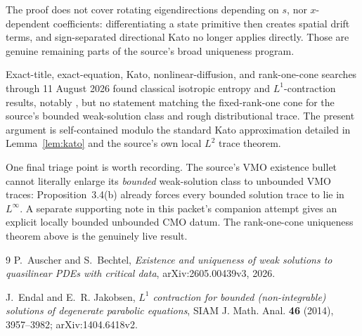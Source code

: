 \documentclass[11pt]{article}
\begin{document}
The proof does not cover rotating eigendirections depending on $s$, nor
$x$-dependent coefficients: differentiating a state primitive then creates
spatial drift terms, and sign-separated directional Kato no longer applies
directly.  Those are genuine remaining parts of the source's broad
uniqueness program.

Exact-title, exact-equation, Kato, nonlinear-diffusion, and rank-one-cone
searches through 11 August 2026 found classical isotropic entropy and
$L^1$-contraction results, notably \cite{EJ}, but no statement matching the
fixed-rank-one cone for the source's bounded weak-solution class and rough
distributional trace.  The present argument is self-contained modulo the
standard Kato approximation detailed in Lemma~\ref{lem:kato} and the source's
own local $L^2$ trace theorem.

One final triage point is worth recording.  The source's VMO existence bullet
cannot literally enlarge its \emph{bounded} weak-solution class to unbounded
VMO traces: Proposition~3.4(b) already forces every bounded solution trace
to lie in $L^\infty$.  A separate supporting note in this packet's companion
attempt gives an explicit locally bounded unbounded CMO datum.  The
rank-one-cone uniqueness theorem above is the genuinely live result.

\begin{thebibliography}{9}
P.~Auscher and S.~Bechtel,
\emph{Existence and uniqueness of weak solutions to quasilinear PDEs with
critical data}, arXiv:2605.00439v3, 2026.

J.~Endal and E.~R. Jakobsen,
\emph{$L^1$ contraction for bounded (non-integrable) solutions of degenerate
parabolic equations}, SIAM J. Math. Anal. \textbf{46} (2014), 3957--3982;
arXiv:1404.6418v2.
\end{thebibliography}
\end{document}
